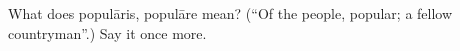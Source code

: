 \begin{tcolorbox}[breakable,colback=teal!4,colframe=teal!35!black,title={Before you move on}]
What does populāris, populāre mean? (\textquotedblleft{}Of the people, popular; a fellow countryman\textquotedblright{}.) Say it once more.
\end{tcolorbox}
